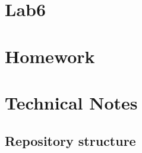 \documentclass[a4paper,12pt,titlepage]{article} %
\begin{document}
\newpage
\section{Lab6}

\newpage
\section{Homework}
\newpage
\section{Technical Notes}
\subsection{Repository structure}
\end{document}
